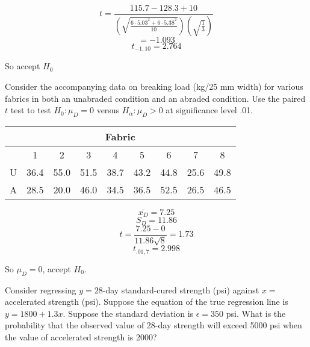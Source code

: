 \begin{questions}
    \begin{solution}

        $$t = \frac{115.7 - 128.3 + 10}{(\sqrt{\frac{6 \cdot 5.03^2 +
        6 \cdot 5.38^2}{10}})(\sqrt{\frac{1}{3}})}$$
        $$ = -1.093$$
        $$t_{-1, 10} = 2.764$$

        So accept $H_0$

    \end{solution}


    \question[2] Consider the accompanying data on breaking load
    (kg/25 mm width) for various fabrics in both an unabraded
    condition and an abraded condition. Use the paired $t$ test to
    test $H_0 : \mu_D = 0$ versus $H_\alpha : \mu_D > 0$ at
    significance level .01.

    \begin{center}
        \begin{tabular}{lcccccccc}
            \multicolumn{9}{c}{Fabric} \\
            \hline
             & 1 & 2 & 3 & 4 & 5 & 6 & 7 & 8 \\
             \hline
             U & 36.4 & 55.0 & 51.5 & 38.7 & 43.2 & 44.8 & 25.6 &
        49.8 \\
             A & 28.5 & 20.0 & 46.0 & 34.5 & 36.5 & 52.5 & 26.5 & 46.5 
         \end{tabular}
    \end{center}

    \begin{solution}
      
          $$\bar{x_D} = 7.25$$
          $$S_D = 11.86$$
          $$t = \frac{7.25 - 0}{11.86\sqrt{8}} = 1.73$$
          $$t_{.01, 7} = 2.998$$

          So $\mu_D = 0$, accept $H_0$.

    \end{solution}


    \question[2] Consider regressing $y = 28$-day standard-cured
    strength (psi) against $x = $ accelerated strength (psi). Suppose
    the equation of the true regression line is $y = 1800 +
    1.3x$. Suppose the standard deviation is $\epsilon = 350$
    psi. What is the probability that the observed value of 28-day
    strength will exceed 5000 psi when the value of accelerated
    strength is 2000?

    \begin{solution}


\end{solution}
\end{questions}
